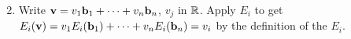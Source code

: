 \begin{multicols}{1}
\begin{ex}
\begin{enumerate}[label={\alph*.}]
\end{enumerate}
\begin{sol}
\begin{enumerate}[label={\alph*.}]
\setcounter{enumi}{1}
\item Write $\textbf{v} = v_{1}\textbf{b}_{1} + \cdots + v_{n}\textbf{b}_{n}$, $v_{j}$ in $\mathbb{R}$. Apply $E_{i}$ to get $E_{i}(\textbf{v}) = v_{1}E_{i}(\textbf{b}_{1}) + \cdots + v_{n}E_{i}(\textbf{b}_{n}) = v_{i}$ by the definition of the $E_{i}$.

\end{enumerate}
\end{sol}
\end{ex}
\end{multicols}
